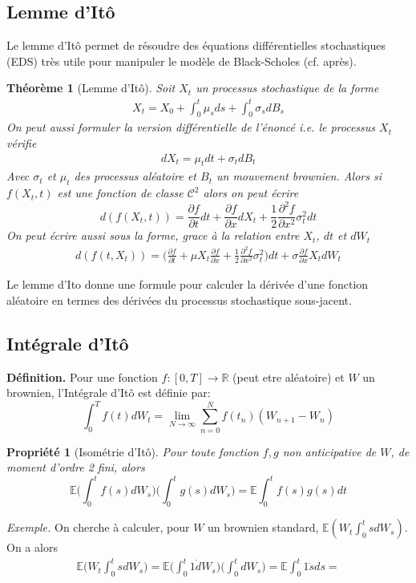 \documentclass[a4paper]{article}
\newtheorem{theorem}{Théorème}[section]
\newtheorem{propriete}{Propriété}[theorem]
\begin{document}
\subsection{Lemme d'Itô}
Le lemme d'Itô permet de résoudre des équations différentielles stochastiques (EDS) très utile pour manipuler le modèle de Black-Scholes (cf. après).
\begin{theorem}[Lemme d'Itô]
Soit $X_t$ un processus stochastique de la forme 
\begin{align*}
    X_t = X_0 + \int_{0}^{t} \mu_s ds + \int_{0}^{t} \sigma_s dB_s
\end{align*}
On peut aussi formuler la version différentielle de l'énoncé i.e. le processus $X_t$ vérifie
\begin{align*}
    dX_t = \mu_t dt + \sigma_t dB_t
\end{align*}
Avec $\sigma_t$ et $\mu_t$ des processus aléatoire et $B_t$ un mouvement brownien. Alors si $f(X_t, t)$ est une fonction de classe $\mathcal{C}^2$ alors on peut écrire
\begin{equation}
    d( f(X_t, t)) = \frac{\partial f}{\partial t}dt + \frac{\partial f}{\partial x}dX_t + \frac{1}{2}\frac{\partial^2 f}{\partial x^2} \sigma_t^2 dt 
\end{equation}
On peut écrire aussi sous la forme, grace à la relation entre $X_t$, $dt$ et $dW_t$
\begin{align*}
     d(f(t,X_t)) = \bigg( \frac{\partial f}{\partial t} + \mu X_t\frac{\partial f}{\partial x} + \frac{1}{2}\frac{\partial^2 f}{\partial x^2} \sigma_t^2 \bigg) dt + \sigma \frac{\partial f}{\partial x} X_t dW_t
\end{align*}
\end{theorem}
Le lemme d'Ito donne une formule pour calculer la dérivée d'une fonction aléatoire en termes des dérivées du processus stochastique sous-jacent.

\subsection{Intégrale d'Itô}
\textbf{Définition.} Pour une fonction $f : [0,T] \rightarrow \mathbb{R}$ (peut etre aléatoire) et $W$ un brownien, l'Intégrale d'Itô est définie par:
\begin{equation}
    \int_{0}^{T} f(t)dW_t = \lim\limits_{N \to \infty} \sum_{n=0}^{N} f(t_n)(W_{n+1}-W_n)
\end{equation}
\begin{propriete}[Isométrie d'Itô]
Pour toute fonction $f,g$ non anticipative de $W$, de moment d'ordre 2 fini, alors
\begin{equation}
    \mathbb{E}\bigg( \int_{0}^{t} f(s)dW_s \bigg)\bigg( \int_{0}^{t} g(s)dW_s \bigg) = \mathbb{E} \int_{0}^{t} f(s)g(s)dt
\end{equation}
\end{propriete}
\textit{Exemple.} On cherche à calculer, pour $W$ un brownien standard, $\mathbb{E} (W_t \int_{0}^{t}s dW_s)$.
On a alors 
\begin{align}
    \mathbb{E} \bigg(W_t \int_{0}^{t} s dW_s \bigg) = \mathbb{E}\bigg( \int_{0}^{t} 1 \dot dW_s \bigg)\bigg( \int_{0}^{t} dW_s \bigg) = \mathbb{E} \int_{0}^{t} 1\dot sds = 
\end{align}
\end{document}
